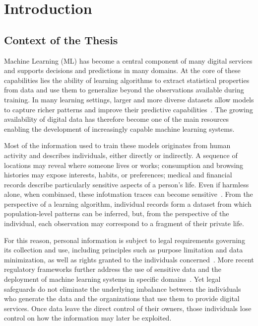 \chapter{Introduction}\label{chap:intro}
\section{Context of the Thesis}\label{sec:context}

Machine Learning (ML) has become a central component of many digital services and supports decisions and predictions in many domains. At the core of these capabilities lies the ability of learning algorithms to extract statistical properties from data and use them to generalize beyond the observations available during training. In many learning settings, larger and more diverse datasets allow models to capture richer patterns and improve their predictive capabilities~\cite{banko-brill-2001-scaling,shalev2014understanding,hestness2017deeplearningscalingpredictable,kaplan2020scalinglawsneurallanguage}. The growing availability of digital data has therefore become one of the main resources enabling the development of increasingly capable machine learning systems.

Most of the information used to train these models originates from human activity and describes individuals, either directly or indirectly. A sequence of locations may reveal where someone lives or works; consumption and browsing histories may expose interests, habits, or preferences; medical and financial records describe particularly sensitive aspects of a person's life.
Even if harmless alone, when combinaed, these infotmation traces can become sensitive~\cite{netflix_attack}. From the perspective of a learning algorithm, individual records form a dataset from which population-level patterns can be inferred, but, from the perspective of the individual, each observation may correspond to a fragment of their private life.


For this reason, personal information is subject to legal requirements governing its collection and use, including principles such as purpose limitation and data minimization, as well as rights granted to the individuals concerned~\cite{eu_gdpr_2016,california_ccpa_cpra}. More recent regulatory frameworks further address the use of sensitive data and the deployment of machine learning systems in specific domains~\cite{eu_ai_act_2024,eu_ehds_2025,Buick_copyright}. Yet legal safeguards do not eliminate the underlying imbalance between the individuals who generate the data and the organizations that use them to provide digital services. Once data leave the direct control of their owners, those individuals lose control on how the information may later be exploited.

